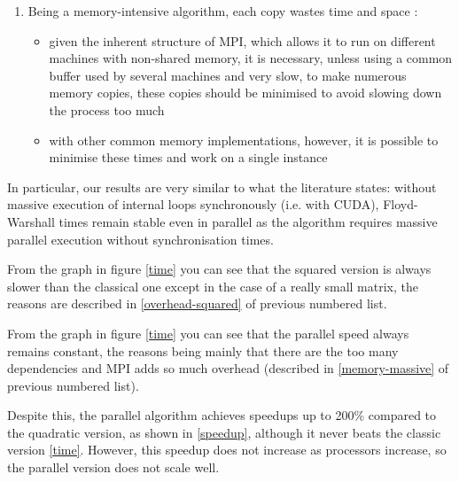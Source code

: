\begin{enumerate}
\begin{itemize}
    \end{itemize}
    \item \label{memory-massive} Being a memory-intensive algorithm, each copy wastes time and space \cite{maras}:
    \begin{itemize}
        \item given the inherent structure of MPI, which allows it to run on different machines with non-shared memory, it is necessary, unless using a common buffer used by several machines and very slow, to make numerous memory copies, these copies should be minimised to avoid slowing down the process too much
        \item with other common memory implementations, however, it is possible to minimise these times and work on a single instance
    \end{itemize}
\end{enumerate}

In particular, our results are very similar to what the literature states: without massive execution of internal loops synchronously (i.e. with CUDA), Floyd-Warshall times remain stable even in parallel as the algorithm requires massive parallel execution without synchronisation times.

From the graph in figure \cref{time} you can see that the squared version is always slower than the classical one except in the case of a really small matrix, the reasons are described in \cref{overhead-squared} of previous numbered list.

From the graph in figure \cref{time} you can see that the parallel speed always remains constant, the reasons being mainly that there are the too many dependencies and MPI adds so much overhead (described in \cref{memory-massive} of previous numbered list).

Despite this, the parallel algorithm achieves speedups up to 200\% compared to the quadratic version, as shown in \cref{speedup}, although it never beats the classic version \cref{time}. However, this speedup does not increase as processors increase, so the parallel version does not scale well.


